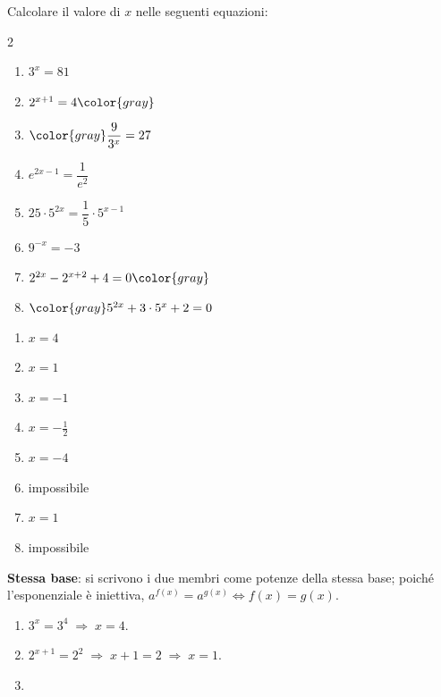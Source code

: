 \begin{question}[ID=3.1, subtitle={Equazioni esponenziali elementari}, difficulty=facile, tags={equazioni, esponenziali}]
Calcolare il valore di $x$ nelle seguenti equazioni:
\begin{center}\begin{minipage}{0.92\linewidth}
\begin{multicols}{2}
\begin{enumerate}[leftmargin=3.2cm]
\item $3^{x} = 81$
\item $2^{x+1} = 4 \color{gray}$
\item $\color{gray}\dfrac{9}{3^x} = 27$
\item $e^{2x-1} = \dfrac{1}{e^2}$
\item $25 \cdot 5^{2x} = \dfrac{1}{5} \cdot 5^{x-1}$
\item $9^{-x} = -3$
\item $2^{2x} - 2^{x+2} + 4 = 0 \color{gray}$
\item $\color{gray} 5^{2x} + 3 \cdot 5^x + 2 = 0$
\end{enumerate}
\end{multicols}
\end{minipage}\end{center}
\begin{solution}
\begin{enumerate}
    \item $x=4$
    \item $x=1$
    \item $x=-1$
    \item $x=-\tfrac12$
    \item $x=-4$
    \item impossibile
    \item $x=1$
    \item impossibile
\end{enumerate}
\end{solution}
\begin{explanation}
\textbf{Stessa base}: si scrivono i due membri come potenze della stessa base; poiché l'esponenziale è iniettiva, $a^{f(x)}=a^{g(x)} \iff f(x)=g(x)$.
\begin{enumerate}
    \item $3^x=3^4 \;\Rightarrow\; x=4$.
    \item $2^{x+1}=2^2 \;\Rightarrow\; x+1=2 \;\Rightarrow\; x=1$.
    \item \[\begin{aligned}

\end{aligned}\]
\end{enumerate}
\end{explanation}
\end{question}
